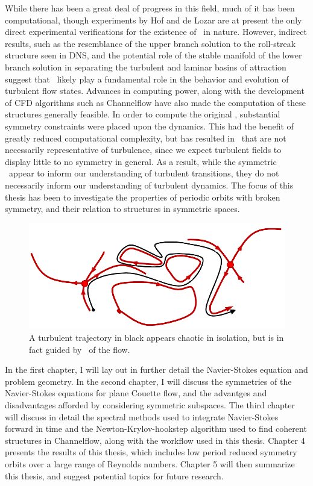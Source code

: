 While there has been a great deal of progress in this field, much of it has been computational, though experiments by Hof and de Lozar  are at present the only direct experimental verifications for the existence of \ecs~in nature. However, indirect results, such as the resemblance of the upper branch solution to the roll-streak structure seen in DNS, and the potential role of the stable manifold of the lower branch solution in separating the turbulent and laminar basins of attraction suggest that \ecs\ likely play a fundamental role in the behavior and evolution of turbulent flow states. Advances in computing power, along with the development of CFD algorithms such as Channelflow have also made the computation of these structures generally feasible. In order to compute the original \ecs, substantial symmetry constraints were placed upon the dynamics. This had the benefit of greatly reduced computational complexity, but has resulted in \ecs\ that are not necessarily representative of turbulence, since we expect turbulent fields to display little to no symmetry in general. As a result, while the symmetric \ecs\ 	appear to inform our understanding of turbulent transitions, they do not necessarily inform our understanding of turbulent dynamics. The focus of this thesis has been to investigate the properties of periodic orbits with broken symmetry, and their relation to structures in symmetric spaces. 
 
\begin{figure}[h]
\centerline{
\includegraphics[width=\textwidth]{Figs/phaseSpaceTraj.pdf}}
\caption{A turbulent trajectory in black appears chaotic in isolation, but is in fact guided by \ecs~of the flow.}\label{fig:guidedTurbulence}
\end{figure}
 In the first chapter, I will lay out in further detail the Navier-Stokes equation and problem geometry. In the second chapter, I will discuss the symmetries of the Navier-Stokes equations for plane Couette flow, and the advantges and disadvantages afforded by considering symmetric subspaces. The third chapter will discuss in detail the spectral methods used to integrate Navier-Stokes forward in time and the Newton-Krylov-hookstep algorithm used to find coherent structures in Channelflow, along with the workflow used in this thesis. Chapter 4 presents the results of this thesis, which includes low period reduced symmetry orbits over a large range of Reynolds numbers. Chapter 5 will then summarize this thesis, and suggest potential topics for future research. 